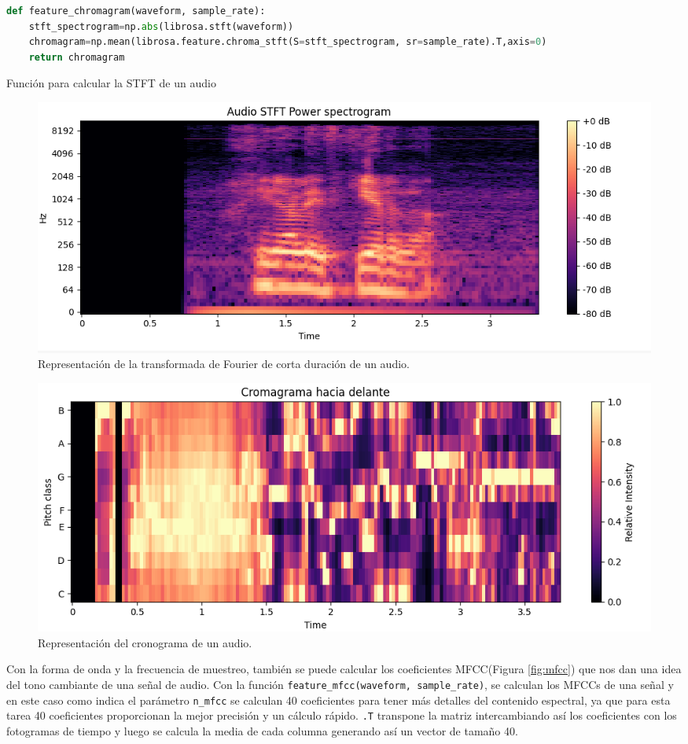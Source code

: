 \begin{code}[H]
\begin{lstlisting}[language=Python]
def feature_chromagram(waveform, sample_rate):
    stft_spectrogram=np.abs(librosa.stft(waveform))
    chromagram=np.mean(librosa.feature.chroma_stft(S=stft_spectrogram, sr=sample_rate).T,axis=0)
    return chromagram
\end{lstlisting}
\caption[Función para calcular la STFT de un audio]{Función para calcular la STFT de un audio}
\label{cod:codejemplo6}
\end{code}

\begin{figure}[H]
  \centering
  \includegraphics[scale=0.4]{figs/stft_spectogram} %
  \caption{ Representación de la transformada de Fourier de corta duración de un audio.}
  \label{fig:stft}
\end{figure}

\begin{figure}[H]
  \centering
  \includegraphics[scale=0.4]{figs/cromagrama} %
  \caption{ Representación del cronograma de un audio.}
  \label{fig:cronograma}
\end{figure}


Con la forma de onda y la frecuencia de muestreo, también se puede calcular los coeficientes MFCC(Figura \ref{fig:mfcc}) que nos dan una idea del tono cambiante de una señal de audio. Con la función \verb|feature_mfcc(waveform, sample_rate)|, se calculan los MFCCs de una señal y en este caso como indica el parámetro \texttt{n\_mfcc} se calculan 40 coeficientes para tener más detalles del contenido espectral, ya que para esta tarea 40 coeficientes proporcionan la mejor precisión y un cálculo rápido. \texttt{.T} transpone la matriz intercambiando así los coeficientes con los fotogramas de tiempo y luego se calcula la media de cada columna generando así un vector de tamaño 40.


